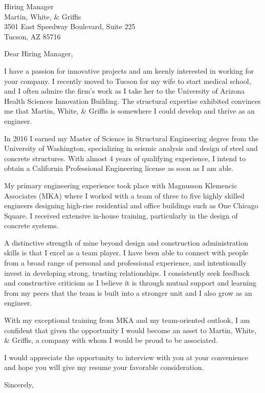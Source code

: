 \documentclass[letterpaper,11pt]{letter}
\begin{document}
\begin{letter}{
    Hiring Manager \\
    Martin, White, \& Griffis \\
    3501 East Speedway Boulevard, Suite 225 \\
    Tucson, AZ  85716
}

\opening{Dear Hiring Manager,}

I have a passion for innovative projects and am keenly interested in working for your company. I recently moved to Tucson for my wife to start medical school, and I often admire the firm's work as I take her to the University of Arizona Health Sciences Innovation Building. The structural expertise exhibited convinces me that Martin, White, \& Griffis is somewhere I could develop and thrive as an engineer.

In 2016 I earned my Master of Science in Structural Engineering degree from the University of Washington, specializing in seismic analysis and design of steel and concrete structures. With almost 4 years of qualifying experience, I intend to obtain a California Professional Engineering license as soon as I am able.


My primary engineering experience took place with Magnusson Klemencic Associates (MKA) where I worked with a team of three to five highly skilled engineers designing high-rise residential and office buildings such as One Chicago Square. I received extensive in-house training, particularly in the design of concrete systems.

A distinctive strength of mine beyond design and construction administration skills is that I excel as a team player. I have been able to connect with people from a broad range of personal and professional experience, and intentionally invest in developing strong, trusting relationships. I consistently seek feedback and constructive criticism as I believe it is through mutual support and learning from my peers that the team is built into a stronger unit and I also grow as an engineer. 

With my exceptional training from MKA and my team-oriented outlook, I am confident that given the opportunity I would become an asset to Martin, White, \& Griffis, a company with whom I would be proud to be associated. 

I would appreciate the opportunity to interview with you at your convenience and hope you will give my resume your favorable consideration. 

\closing{Sincerely,}

\end{letter}
\end{document}
